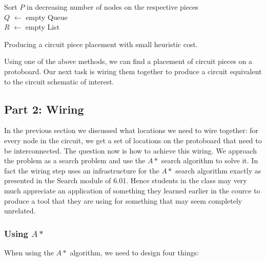 \begin{algorithm}
\BlankLine
Sort $P$ in decreasing number of nodes on the respective pieces\\
$Q$ $\leftarrow$ empty Queue\\
$R$ $\leftarrow$ empty List\\
\caption{Producing a circuit piece placement with small heuristic cost.}
\label{alg:small_cost_placement}
\end{algorithm}

Using one of the above methods, we can find a placement of circuit pieces on a
protoboard. Our next task is wiring them together to produce a circuit
equivalent to the circuit schematic of interest.

\subsection{Part 2: Wiring}

In the previous section we discussed what locations we need to wire together:
for every node in the circuit, we get a set of locations on the protoboard that
need to be interconnected. The question now is how to achieve this wiring. We
approach the problem as a search problem and use the $A*$ search algorithm to
solve it. In fact the wiring step uses an infrastructure for the $A*$ search
algorithm exactly as presented in the Search module of 6.01. Hence students in
the class may very much appreciate an application of something they learned
earlier in the cource to produce a tool that they are using for something that
may seem completely unrelated.

\subsubsection{Using $A*$}

When using the $A*$ algorithm, we need to design four things:

